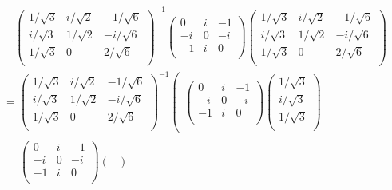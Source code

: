 \documentclass[dvipdfmx]{jsarticle}
\begin{document}
\begin{align*}
&\quad \begin{pmatrix}
{1}/{\sqrt{3}} & {i}/{\sqrt{2}} & - {1}/{\sqrt{6}} \\
{i}/{\sqrt{3}} & {1}/{\sqrt{2}} & - {i}/{\sqrt{6}} \\
{1}/{\sqrt{3}} & 0 & {2}/{\sqrt{6}} \\
\end{pmatrix}^{- 1}\begin{pmatrix}
0 & i & - 1 \\
 - i & 0 & - i \\
 - 1 & i & 0 \\
\end{pmatrix}\begin{pmatrix}
{1}/{\sqrt{3}} & {i}/{\sqrt{2}} & - {1}/{\sqrt{6}} \\
{i}/{\sqrt{3}} & {1}/{\sqrt{2}} & - {i}/{\sqrt{6}} \\
{1}/{\sqrt{3}} & 0 & {2}/{\sqrt{6}} \\
\end{pmatrix}\\
&= \begin{pmatrix}
{1}/{\sqrt{3}} & {i}/{\sqrt{2}} & - {1}/{\sqrt{6}} \\
{i}/{\sqrt{3}} & {1}/{\sqrt{2}} & - {i}/{\sqrt{6}} \\
{1}/{\sqrt{3}} & 0 & {2}/{\sqrt{6}} \\
\end{pmatrix}^{- 1} \left( \begin{matrix}
\begin{pmatrix}
0 & i & - 1 \\
 - i & 0 & - i \\
 - 1 & i & 0 \\
\end{pmatrix}\begin{pmatrix}
{1}/{\sqrt{3}} \\
{i}/{\sqrt{3}} \\
{1}/{\sqrt{3}} \\
\end{pmatrix} \end{matrix} \right. \\
&\quad \left. \begin{matrix} \begin{pmatrix}
0 & i & - 1 \\
 - i & 0 & - i \\
 - 1 & i & 0 \\
\end{pmatrix}\begin{pmatrix}

\end{pmatrix}
\end{matrix}
\end{align*}
\end{document}
